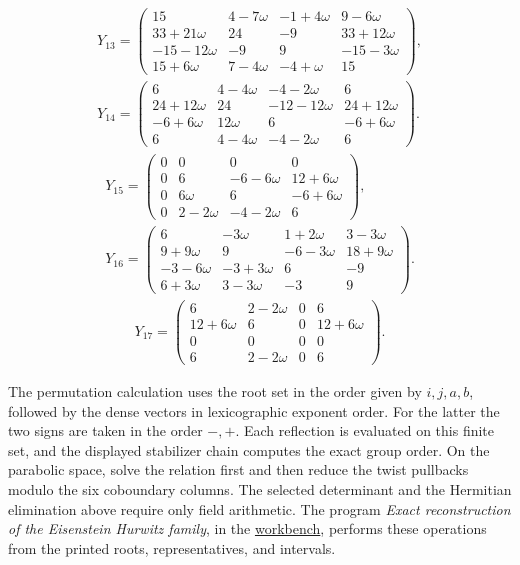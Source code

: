 \documentclass[11pt]{article}
\theoremstyle{definition}
\theoremstyle{remark}
\newcommand{\workbenchurl}{https://github.com/KokunoYumeto/algebraic-cycles-and-motives-workbench}
\begin{document}
\[
\begin{gathered}
Y_{13}=\begin{pmatrix}15&4-7\omega&-1+4\omega&9-6\omega\\
33+21\omega&24&-9&33+12\omega\\
-15-12\omega&-9&9&-15-3\omega\\
15+6\omega&7-4\omega&-4+\omega&15\end{pmatrix},\\[1ex]
Y_{14}=\begin{pmatrix}6&4-4\omega&-4-2\omega&6\\
24+12\omega&24&-12-12\omega&24+12\omega\\
-6+6\omega&12\omega&6&-6+6\omega\\
6&4-4\omega&-4-2\omega&6\end{pmatrix} .
\end{gathered}
\]
\[
\begin{gathered}
Y_{15}=\begin{pmatrix}0&0&0&0\\
0&6&-6-6\omega&12+6\omega\\
0&6\omega&6&-6+6\omega\\
0&2-2\omega&-4-2\omega&6\end{pmatrix},\\[1ex]
Y_{16}=\begin{pmatrix}6&-3\omega&1+2\omega&3-3\omega\\
9+9\omega&9&-6-3\omega&18+9\omega\\
-3-6\omega&-3+3\omega&6&-9\\
6+3\omega&3-3\omega&-3&9\end{pmatrix} .
\end{gathered}
\]
\[
\begin{gathered}
Y_{17}=\begin{pmatrix}6&2-2\omega&0&6\\
12+6\omega&6&0&12+6\omega\\
0&0&0&0\\
6&2-2\omega&0&6\end{pmatrix} .
\end{gathered}
\]

The permutation calculation uses the root set in the order given by
$i,j,a,b$, followed by the dense vectors in lexicographic exponent order.
For the latter the two signs are taken in the order $-,+$.
Each reflection is evaluated on this finite set, and the displayed
stabilizer chain computes the exact group order.  On the parabolic
space, solve the relation first and then reduce the twist pullbacks
modulo the six coboundary columns.  The selected determinant and the
Hermitian elimination above require only field arithmetic.  The program \emph{Exact reconstruction of the Eisenstein Hurwitz family}, in the \href{\workbenchurl}{workbench}, performs these operations from the printed roots, representatives, and intervals.
\end{document}
